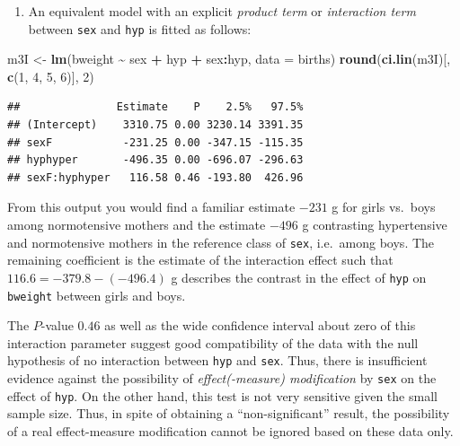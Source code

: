 \documentclass[
]{book}
\newenvironment{Shaded}{\begin{snugshade}}{\end{snugshade}}
\newcommand{\AttributeTok}[1]{\textcolor[rgb]{0.13,0.29,0.53}{#1}}
\newcommand{\DecValTok}[1]{\textcolor[rgb]{0.00,0.00,0.81}{#1}}
\newcommand{\FunctionTok}[1]{\textcolor[rgb]{0.13,0.29,0.53}{\textbf{#1}}}
\newcommand{\NormalTok}[1]{#1}
\newcommand{\OtherTok}[1]{\textcolor[rgb]{0.56,0.35,0.01}{#1}}
\newcommand{\SpecialCharTok}[1]{\textcolor[rgb]{0.81,0.36,0.00}{\textbf{#1}}}
\providecommand{\tightlist}{%
  \setlength{\itemsep}{0pt}\setlength{\parskip}{0pt}}
\begin{document}
\begin{enumerate}
\def\labelenumi{\arabic{enumi}.}
\setcounter{enumi}{2}
\tightlist
\item
  An equivalent model with an explicit \emph{product term} or
  \emph{interaction term} between \texttt{sex} and \texttt{hyp} is
  fitted as follows:
\end{enumerate}

\begin{Shaded}
\begin{Highlighting}[]
\NormalTok{m3I }\OtherTok{\textless{}{-}} \FunctionTok{lm}\NormalTok{(bweight }\SpecialCharTok{\textasciitilde{}}\NormalTok{ sex }\SpecialCharTok{+}\NormalTok{ hyp }\SpecialCharTok{+}\NormalTok{ sex}\SpecialCharTok{:}\NormalTok{hyp, }\AttributeTok{data =}\NormalTok{ births)}
\FunctionTok{round}\NormalTok{(}\FunctionTok{ci.lin}\NormalTok{(m3I)[, }\FunctionTok{c}\NormalTok{(}\DecValTok{1}\NormalTok{, }\DecValTok{4}\NormalTok{, }\DecValTok{5}\NormalTok{, }\DecValTok{6}\NormalTok{)], }\DecValTok{2}\NormalTok{)}
\end{Highlighting}
\end{Shaded}

\begin{verbatim}
##               Estimate    P    2.5%   97.5%
## (Intercept)    3310.75 0.00 3230.14 3391.35
## sexF           -231.25 0.00 -347.15 -115.35
## hyphyper       -496.35 0.00 -696.07 -296.63
## sexF:hyphyper   116.58 0.46 -193.80  426.96
\end{verbatim}

From this output you would find a familiar estimate \(-231\) g for girls
vs.~boys among normotensive mothers and the estimate \(-496\) g
contrasting hypertensive and normotensive mothers in the
reference class of \texttt{sex}, i.e.~among boys.
The remaining coefficient is the estimate of the interaction
effect such that \(116.6 = -379.8 -(-496.4)\) g
describes the contrast in the effect of \texttt{hyp} on \texttt{bweight}
between girls and boys.

The \(P\)-value \(0.46\) as well
as the wide confidence interval about zero of this interaction
parameter suggest good compatibility of the data with
the null hypothesis of
no interaction between \texttt{hyp} and \texttt{sex}. Thus,
there is insufficient evidence against
the possibility of \emph{effect(-measure) modification} by
\texttt{sex} on the effect of \texttt{hyp}.
On the other hand, this test is not very sensitive given
the small sample size. Thus, in spite of obtaining a ``non-significant''
result, the possibility of a real effect-measure modification
cannot be ignored based on these data only.
\end{document}
